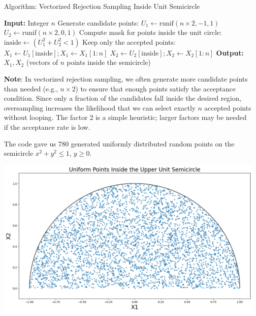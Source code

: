 \documentclass[8pt]{beamer}
\begin{document}
\begin{frame}[fragile]{Algorithm: Vectorized Rejection Sampling Inside Unit Semicircle}
\begin{algorithm}[H]
    \caption{Generate $n$ points $(X_1, X_2)$ uniformly inside the semicircle (vectorized)}
    \begin{algorithmic}[1]
        \State \textbf{Input:} Integer $n$
        \State Generate candidate points:
        \Statex \quad $U_1 \gets \text{runif}(n \times 2, -1, 1)$
        \Statex \quad $U_2 \gets \text{runif}(n \times 2, 0, 1)$
        \State Compute mask for points inside the unit circle:
        \Statex \quad $\text{inside} \gets (U_1^2 + U_2^2 < 1)$
        \State Keep only the accepted points:
        \Statex \quad $X_1 \gets U_1[\text{inside}]; X_1 \gets X_1[1:n]$
        \Statex \quad $X_2 \gets U_2[\text{inside}]; X_2 \gets X_2[1:n]$
        \State \textbf{Output:} $X_1, X_2$ (vectors of $n$ points inside the semicircle)
    \end{algorithmic}
\end{algorithm}

\textbf{Note}: In vectorized rejection sampling, we often generate more candidate points than needed (e.g., $n\times 2$) to ensure that enough points satisfy the acceptance condition. Since only a fraction of the candidates fall inside the desired region, oversampling increases the likelihood that we can select exactly $n$ accepted points without looping. The factor 2 is a simple heuristic; larger factors may be needed if the acceptance rate is low.
\end{frame}

\begin{frame}
The code gave us 780 generated uniformly distributed random points on the semicircle $x^2+y^2\leq 1$, $y\geq 0$. 

\begin{center}
\includegraphics[width=\textwidth]{chapter1-part4-plot3.png}
\end{center}
\end{frame}
\end{document}
